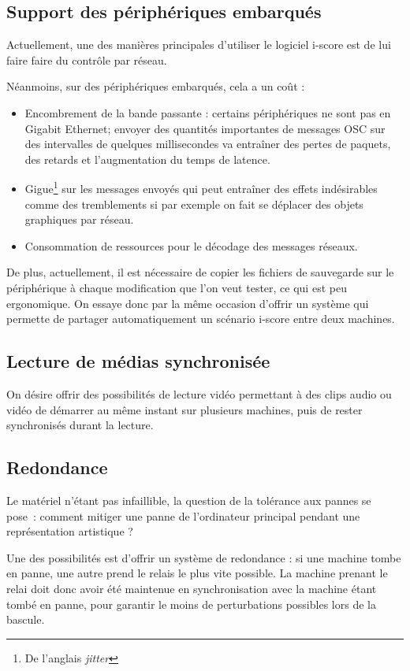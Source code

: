 \documentclass{article}
\begin{document}
\subsection{Support des périphériques embarqués}
Actuellement, une des manières principales d'utiliser le logiciel i-score est de lui faire faire du contrôle par réseau. 

Néanmoins, sur des périphériques embarqués, cela a un coût : 
\begin{itemize}
    \item Encombrement de la bande passante : certains périphériques ne sont pas en Gigabit Ethernet; envoyer des quantités importantes de messages OSC sur des intervalles de quelques millisecondes va entraîner des pertes de paquets, des retards et l'augmentation du temps de latence.
    \item Gigue\footnote{De l'anglais \textit{jitter}} sur les messages envoyés qui peut entraîner des effets indésirables comme des tremblements si par exemple on fait se déplacer des objets graphiques par réseau.
    \item Consommation de ressources pour le décodage des messages réseaux.
\end{itemize}

De plus, actuellement, il est nécessaire de copier les fichiers de sauvegarde sur le périphérique à chaque modification que l'on veut tester, ce qui est peu ergonomique. 
On essaye donc par la même occasion d'offrir un système qui permette de partager automatiquement un scénario i-score entre deux machines.

\subsection{Lecture de médias synchronisée}
On désire offrir des possibilités de lecture vidéo permettant à 
des clips audio ou vidéo de démarrer au même instant sur plusieurs machines, 
puis de rester synchronisés durant la lecture.

\subsection{Redondance}
Le matériel n'étant pas infaillible, la question de la tolérance aux pannes se pose~: comment mitiger une panne de l'ordinateur principal pendant une représentation artistique ?

Une des possibilités est d'offrir un système de redondance : si une machine tombe en panne, une autre prend le relais le plus vite possible.
La machine prenant le relai doit donc avoir été maintenue en synchronisation avec la machine étant tombé en panne, pour garantir le moins de perturbations possibles lors de la bascule.
 
\end{document}
